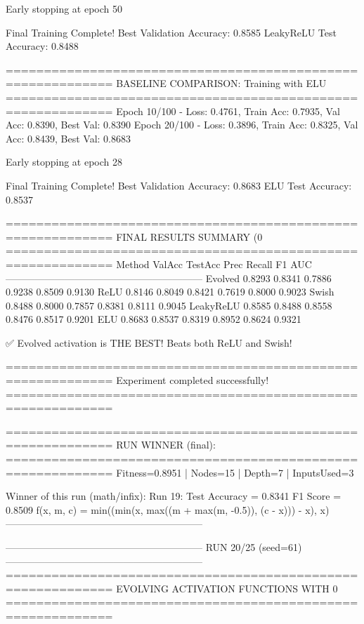 Early stopping at epoch 50

Final Training Complete!
Best Validation Accuracy: 0.8585
LeakyReLU Test Accuracy: 0.8488

============================================================
BASELINE COMPARISON: Training with ELU
============================================================
Epoch  10/100 - Loss: 0.4761, Train Acc: 0.7935, Val Acc: 0.8390, Best Val: 0.8390
Epoch  20/100 - Loss: 0.3896, Train Acc: 0.8325, Val Acc: 0.8439, Best Val: 0.8683

Early stopping at epoch 28

Final Training Complete!
Best Validation Accuracy: 0.8683
ELU Test Accuracy: 0.8537

============================================================
FINAL RESULTS SUMMARY (0%
============================================================
Method             ValAcc     TestAcc    Prec       Recall     F1         AUC
------------------------------------------------------------
Evolved            0.8293     0.8341     0.7886     0.9238     0.8509     0.9130
ReLU               0.8146     0.8049     0.8421     0.7619     0.8000     0.9023
Swish              0.8488     0.8000     0.7857     0.8381     0.8111     0.9045
LeakyReLU          0.8585     0.8488     0.8558     0.8476     0.8517     0.9201
ELU                0.8683     0.8537     0.8319     0.8952     0.8624     0.9321

✅ Evolved activation is THE BEST! Beats both ReLU and Swish!

============================================================
Experiment completed successfully!
============================================================

============================================================
RUN WINNER (final):
============================================================
Fitness=0.8951 | Nodes=15 | Depth=7 | InputsUsed=3

Winner of this run (math/infix):
  Run 19:
     Test Accuracy = 0.8341
     F1 Score      = 0.8509
     f(x, m, c)    = min((min(x, max((m + max(m, -0.5)), (c - x))) - x), x)
------------------------------------------------------------

------------------------------------------------------------
RUN 20/25 (seed=61)
------------------------------------------------------------
============================================================
EVOLVING ACTIVATION FUNCTIONS
WITH 0%
============================================================


